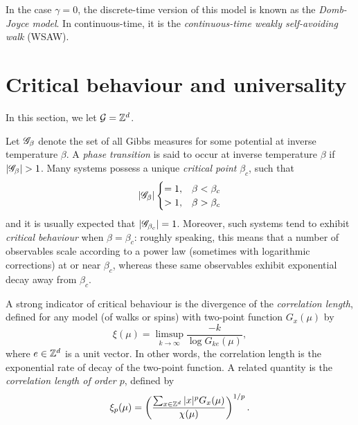 In the case $\gamma = 0$, the discrete-time version of this model is known as
the \emph{Domb-Joyce model}. In continuous-time, it is the \emph{continuous-time
weakly self-avoiding walk} (WSAW).


\section{Critical behaviour and universality}


In this section, we let $\mathcal{G} = { {{\mathbb Z}}^d }$.

Let $\mathscr{G}_\beta$ denote the set of all Gibbs measures for some potential at inverse temperature
$\beta$. A \emph{phase transition} is said to occur at inverse temperature $\beta$ if
$|\mathscr{G}_\beta| > 1$. Many systems possess a unique \emph{critical point} $\beta_c$, such that
\begin{equation}
|\mathscr{G}_\beta|
\begin{cases}
=1,  & \beta < \beta_c \\
> 1, & \beta > \beta_c
\end{cases}
\end{equation}
and it is usually expected that $|\mathscr{G}_{\beta_c}| = 1$.
Moreover, such systems tend to exhibit \emph{critical behaviour} when $\beta = \beta_c$:
roughly speaking, this means that a number of observables scale according to a power
law (sometimes with logarithmic corrections) at or near $\beta_c$, whereas these same
observables exhibit exponential decay away from $\beta_c$.

A strong indicator of critical behaviour is the divergence of the
\emph{correlation length}, defined for any model (of walks or spins) with two-point
function $G_x(\mu)$ by
\begin{equation}
\xi(\mu) = \limsup_{k\to\infty} \frac{-k}{\log G_{ke}(\mu)},
\end{equation}
where $e \in { {{\mathbb Z}}^d }$ is a unit vector.
In other words, the correlation length is the exponential rate of decay of the
two-point function.
A related quantity is the \emph{correlation length of order $p$}, defined by
\begin{equation}
\xi_p(\mu) = \left(\frac{\sum_{x\in{ {{\mathbb Z}}^d }} |x|^p G_x(\mu)}{\chi(\mu)}\right)^{1/p}.
\end{equation}

